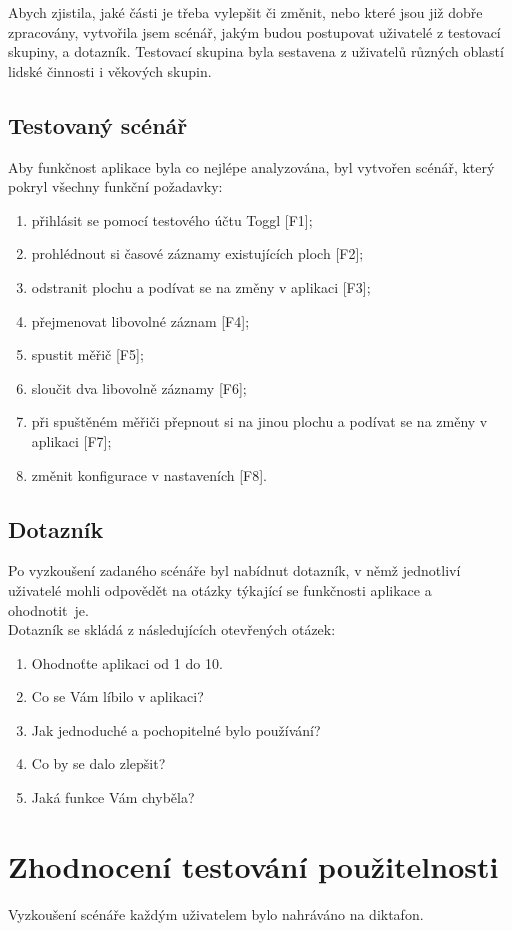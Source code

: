 \documentclass[thesis=B,czech]{FITthesis}[2012/06/26]
\begin{document}
Abych zjistila, jaké části je třeba vylepšit či změnit, nebo které jsou již dobře zpracovány, vytvořila jsem scénář, jakým budou postupovat uživatelé z testovací skupiny, a dotazník. Testovací skupina byla sestavena z uživatelů různých oblastí lidské činnosti i věkových skupin.  

\subsection{Testovaný scénář}

Aby funkčnost aplikace byla co nejlépe analyzována, byl vytvořen scénář, který pokryl všechny funkční požadavky: 
\begin{enumerate}
	\item přihlásit se pomocí testového účtu Toggl [F1];
	\item prohlédnout si časové záznamy existujících ploch [F2];
	\item odstranit plochu a podívat se na změny v aplikaci [F3];
	\item přejmenovat libovolné záznam [F4];
	\item spustit měřič [F5];
	\item sloučit dva libovolně záznamy [F6];
	\item při spuštěném měřiči přepnout si na jinou plochu a podívat se na změny v aplikaci [F7];
	\item změnit konfigurace v nastaveních [F8].
\end{enumerate}
 
\subsection{Dotazník}
Po vyzkoušení zadaného scénáře byl nabídnut dotazník, v němž jednotliví uživatelé mohli odpovědět na otázky týkající se funkčnosti aplikace a ohodnotit~je. \\
Dotazník se skládá z následujících otevřených otázek: 
\begin{enumerate}
	\item Ohodnoťte aplikaci od 1 do 10.
	\item Co se Vám líbilo v aplikaci?
	\item Jak jednoduché a pochopitelné bylo používání?
	\item Co by se dalo zlepšit?
	\item Jaká funkce Vám chyběla? 
\end{enumerate}
\newpage
\section{Zhodnocení testování použitelnosti}
Vyzkoušení scénáře každým uživatelem bylo nahráváno na diktafon.
\end{document}

